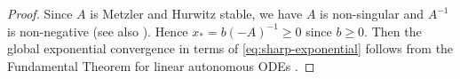 \documentclass[10pt]{amsart}
\numberwithin{equation}{section}
\theoremstyle{plain}
\theoremstyle{definition}
\theoremstyle{remark}
\begin{document}
\begin{proof}
Since $A$ is Metzler and Hurwitz stable, we have $A$ is non-singular and $A^{-1}$ is non-negative \cite[Theorem~2.5.3]{HJ94} (see also \cite[Chapter 6, Theorem~2.3]{BP94}). Hence $x_*=b(-A)^{-1}\ge0$ since $b\ge0$. Then the global exponential convergence in terms of \eqref{eq:sharp-exponential} follows from the Fundamental Theorem for linear autonomous ODEs \cite[Chapter~1]{P13}.
\end{proof}



{\small}
\end{document}
